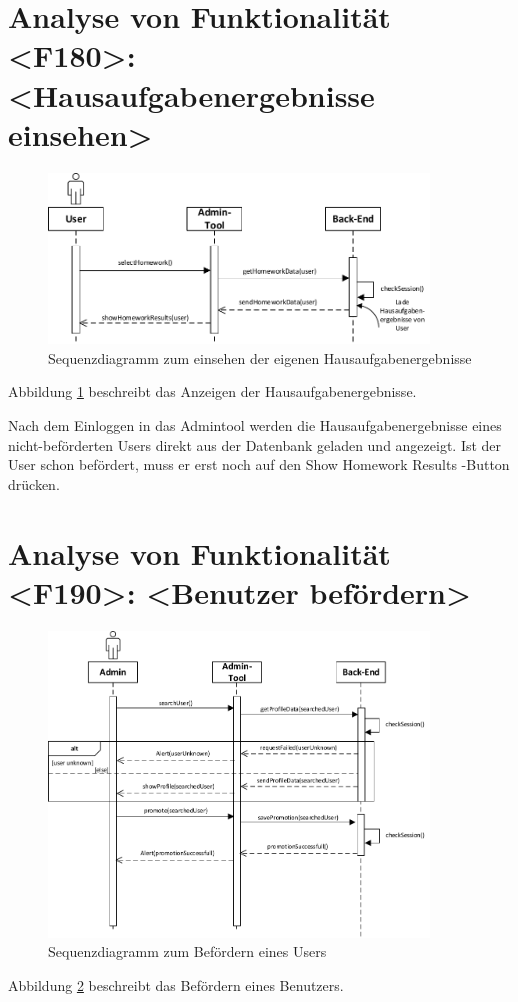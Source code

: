 \section{Analyse von Funktionalität <F180>: <Hausaufgabenergebnisse einsehen>}
\begin{figure}[h]
\centering
\includegraphics[width=0.9\textwidth]{figures/sequenz_F180.pdf}
\caption{Sequenzdiagramm zum einsehen der eigenen Hausaufgabenergebnisse}
\label{sequence_f180}
\end{figure}
Abbildung \ref{sequence_f180} beschreibt das Anzeigen der Hausaufgabenergebnisse.

Nach dem Einloggen in das Admintool werden die Hausaufgabenergebnisse eines nicht-beförderten Users direkt aus der Datenbank geladen und angezeigt.
Ist der User schon \glqq befördert\grqq , muss er erst noch auf den \glqq Show Homework Results \grqq -Button drücken.

\newpage
\section{Analyse von Funktionalität <F190>: <Benutzer befördern>}
\begin{figure}[h]
\centering
\includegraphics[width=0.9\textwidth]{figures/sequenz_F190.pdf}
\caption{Sequenzdiagramm zum Befördern eines Users}
\label{sequence_f190}
\end{figure}
Abbildung \ref{sequence_f190} beschreibt das Befördern eines Benutzers.

